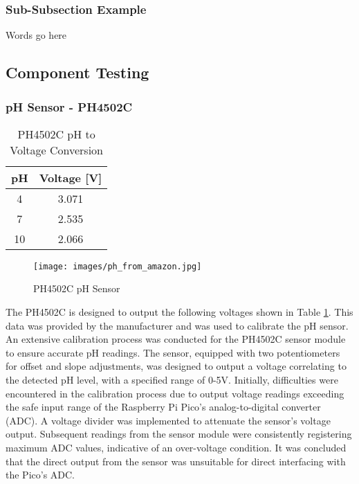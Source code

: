 \documentclass[12pt]{article}
\begin{document}
\subsubsection{Sub-Subsection Example}
\noindent Words go here

\subsection{Component Testing}
\subsubsection{pH Sensor - PH4502C}
\begin{table}[H]
    \centering
    \begin{tabular}{|c|c|}
        \hline
        \textbf{pH} & \textbf{Voltage [V]} \\
        \hline
        4 & 3.071\\
        \hline
        7 & 2.535\\
        \hline
        10 & 2.066\\
        \hline
    \end{tabular}
    \caption{PH4502C pH to Voltage Conversion}
    \label{tab:PH4502C}
\end{table}
\begin{figure}[H]
    \centering
    \texttt{[image: images/ph\_from\_amazon.jpg]}
    \caption{PH4502C pH Sensor \cite{ref_ph_amazon}}
    \label{fig:PH4502C}
\end{figure}
\noindent The PH4502C is designed to output the following voltages shown in Table \ref{tab:PH4502C}.
This data was provided by the manufacturer and was used to calibrate the pH sensor. An extensive calibration process was conducted for the PH4502C sensor module to ensure accurate pH readings. The sensor, equipped with two potentiometers for offset and slope adjustments, was designed to output a voltage correlating to the detected pH level, with a specified range of 0-5V.
\newline
\newline
\noindent Initially, difficulties were encountered in the calibration process due to output voltage readings exceeding the safe input range of the Raspberry Pi Pico’s analog-to-digital converter (ADC). A voltage divider was implemented to attenuate the sensor's voltage output. Subsequent readings from the sensor module were consistently registering maximum ADC values, indicative of an over-voltage condition. It was concluded that the direct output from the sensor was unsuitable for direct interfacing with the Pico’s ADC.
\end{document}
